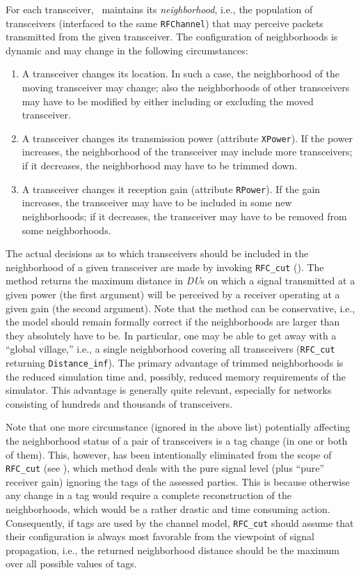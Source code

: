 For each transceiver, \smurph\ maintains its {\em neighborhood}, i.e., the
population of transceivers (interfaced to the same {\tt RFChannel}) that may
perceive packets transmitted from the given transceiver.
The configuration of neighborhoods is dynamic and may change in the following
circumstances:

\begin{enumerate}
\item
A transceiver changes its location.
In such a case, the neighborhood of the moving transceiver may change; also
the neighborhoods of other transceivers may have to be modified by either
including or excluding the moved transceiver.
\item
A transceiver changes its transmission power (attribute {\tt XPower}).
If the power increases, the neighborhood of the transceiver may include more
transceivers; if it decreases, the neighborhood may have to be trimmed down.
\item
A transceiver changes it reception gain (attribute {\tt RPower}).
If the gain increases, the transceiver may have to be included in some
new neighborhoods; if it decreases, the transceiver may have to be removed
from some neighborhoods.
\end{enumerate}

The actual decisions as to which transceivers should be included in the
neighborhood of a given transceiver are made by invoking {\tt RFC\_cut}
().
The method returns the maximum distance in {\em DU\/}s on which a signal
transmitted at a given power (the first argument) will be perceived by
a receiver operating at a given gain (the second argument).
Note that the method can be conservative, i.e., the model should remain 
formally correct if the neighborhoods are larger than they absolutely have
to be.
In particular, one may be able to get away with a ``global village,'' i.e.,
a single neighborhood covering all transceivers ({\tt RFC\_cut} returning
{\tt Distance\_inf}).
The primary advantage of trimmed neighborhoods is the reduced simulation time
and, possibly, reduced memory requirements of the simulator.
This advantage is generally quite relevant, especially for networks consisting
of hundreds and thousands of transceivers.

Note that one more circumstance (ignored in the above list) potentially
affecting the neighborhood status of a pair of transceivers is a tag change
(in one or both of them).
This, however, has been intentionally eliminated from the scope of
{\tt RFC\_cut} (see ), which method deals with the
pure signal level (plus ``pure'' receiver gain) ignoring the tags of
the assessed parties.
This is because otherwise any change in a tag would require a complete
reconstruction of the neighborhoods, which would be a rather drastic and time
consuming action.
Consequently, if tags are used by the channel model,
{\tt RFC\_cut} should assume that their configuration is always
most favorable from the viewpoint of signal propagation, i.e., the returned
neighborhood distance should be the maximum over all possible values of tags.

